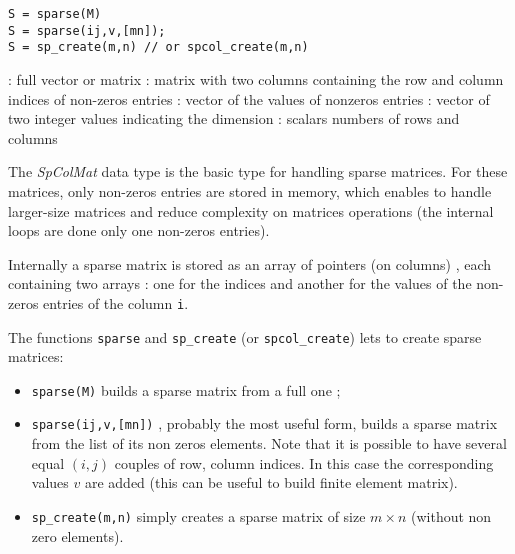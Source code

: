 
\begin{mandesc}
\end{mandesc}
\begin{calling_sequence}
\begin{verbatim}
S = sparse(M)
S = sparse(ij,v,[mn]);
S = sp_create(m,n) // or spcol_create(m,n)
\end{verbatim}

\end{calling_sequence}
\begin{parameters}
  \begin{varlist}
    :  full vector or matrix  
    : matrix with two columns containing the row and column indices of 
                non-zeros entries  
    : vector of the values of nonzeros entries
    : vector of two integer values indicating the dimension 
    : scalars numbers of rows and columns
  \end{varlist}
\end{parameters}

\begin{mandescription}

The \emph{SpColMat} data type is the basic type for handling sparse matrices. 
For these matrices, only non-zeros entries are stored in memory, which enables to 
handle larger-size matrices and reduce complexity on matrices operations (the internal
loops are done only one non-zeros entries).

Internally a sparse matrix is stored as an array of pointers (on columns) , each containing 
two arrays : one for the indices and another for the values of the non-zeros entries of
the column \verb+i+. 
 
The functions \verb+sparse+ and \verb+sp_create+ (or  \verb+spcol_create+) lets to create
sparse matrices:
\begin{itemize}
\item \verb+sparse(M)+ builds a sparse matrix from a full one ;
\item \verb+sparse(ij,v,[mn])+ , probably the most useful form, builds a sparse matrix
   from the list of its non zeros elements. Note that it is possible to have several equal
   $(i,j)$ couples of row, column indices. In this case the corresponding values $v$ are 
   added (this can be useful to build finite element matrix).
\item \verb+sp_create(m,n)+ simply creates a sparse matrix of size $m \times n$ (without
   non zero elements).   
\end{itemize}

\end{mandescription}

